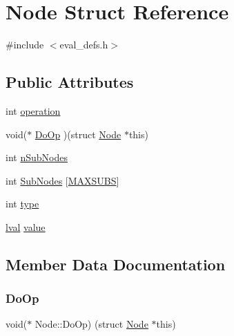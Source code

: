 \hypertarget{struct_node}{}\section{Node Struct Reference}
\label{struct_node}


{\ttfamily \#include $<$eval\+\_\+defs.\+h$>$}

\subsection*{Public Attributes}
\begin{DoxyCompactItemize}
\item 
int \hyperlink{struct_node_a80c597fa5c0fb320efdc06f06f18ec07}{operation}
\item 
void($\ast$ \hyperlink{struct_node_adcae558212719962ec9dc2b17ed0322f}{Do\+Op} )(struct \hyperlink{struct_node}{Node} $\ast$this)
\item 
int \hyperlink{struct_node_a459c84b7160152638dd4751f88829bee}{n\+Sub\+Nodes}
\item 
int \hyperlink{struct_node_a88da4d42c58b4cf1679d2590199d4653}{Sub\+Nodes} \mbox{[}\hyperlink{eval__defs_8h_a948bcf3a95aad00062f101ec770387f0}{M\+A\+X\+S\+U\+BS}\mbox{]}
\item 
int \hyperlink{struct_node_a86fcc8384153457dcc9bcaf65c8fbec3}{type}
\item 
\hyperlink{structlval}{lval} \hyperlink{struct_node_afad6c2fba9562673ba72cf84fbb8b4c4}{value}
\end{DoxyCompactItemize}


\subsection{Member Data Documentation}
\mbox{\label{struct_node_adcae558212719962ec9dc2b17ed0322f}} 
\subsubsection{\texorpdfstring{Do\+Op}{DoOp}}
{\footnotesize\ttfamily void($\ast$ Node\+::\+Do\+Op) (struct \hyperlink{struct_node}{Node} $\ast$this)}

\mbox{\label{struct_node_a459c84b7160152638dd4751f88829bee}} 
